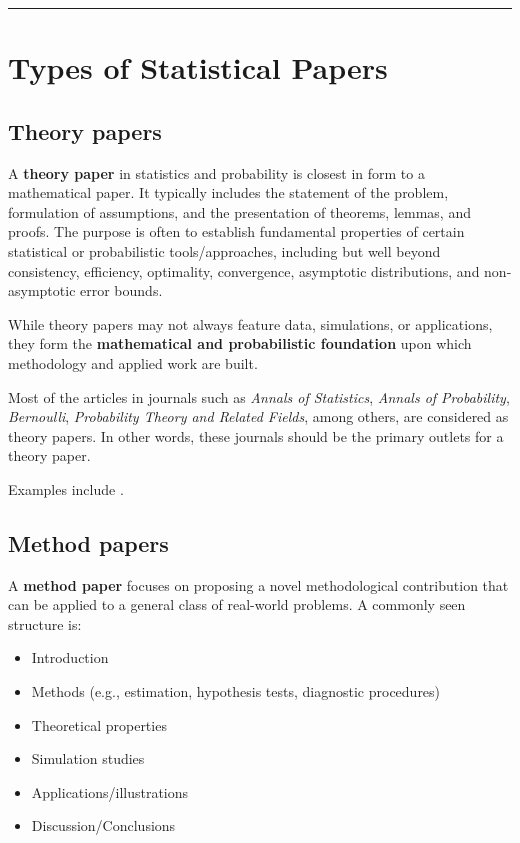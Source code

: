 \documentclass[
]{book}
\providecommand{\tightlist}{%
  \setlength{\itemsep}{0pt}\setlength{\parskip}{0pt}}
\theoremstyle{definition}
\theoremstyle{definition}
\theoremstyle{definition}
\theoremstyle{definition}
\theoremstyle{remark}
\begin{document}
\begin{center}\rule{0.5\linewidth}{0.5pt}\end{center}

\section{Types of Statistical Papers}\label{types-of-statistical-papers}

\subsection{Theory papers}\label{theory-papers}

A \textbf{theory paper} in statistics and probability is closest in form to a mathematical paper. It typically includes the statement of the problem, formulation of assumptions, and the presentation of theorems, lemmas, and proofs. The purpose is often to establish fundamental properties of certain statistical or probabilistic tools/approaches, including but well beyond consistency, efficiency, optimality, convergence, asymptotic distributions, and non-asymptotic error bounds.

While theory papers may not always feature data, simulations, or applications, they form the \textbf{mathematical and probabilistic foundation} upon which methodology and applied work are built.

Most of the articles in journals such as \emph{Annals of Statistics}, \emph{Annals of Probability}, \emph{Bernoulli}, \emph{Probability Theory and Related Fields}, among others, are considered as theory papers. In other words, these journals should be the primary outlets for a theory paper.

Examples include \citet{Foygel2021}.

\subsection{Method papers}\label{method-papers}

A \textbf{method paper} focuses on proposing a novel methodological contribution that can be applied to a general class of real-world problems. A commonly seen structure is:

\begin{itemize}
\tightlist
\item
  Introduction\\
\item
  Methods (e.g., estimation, hypothesis tests, diagnostic procedures)\\
\item
  Theoretical properties\\
\item
  Simulation studies\\
\item
  Applications/illustrations\\
\item
  Discussion/Conclusions
\end{itemize}
\end{document}
